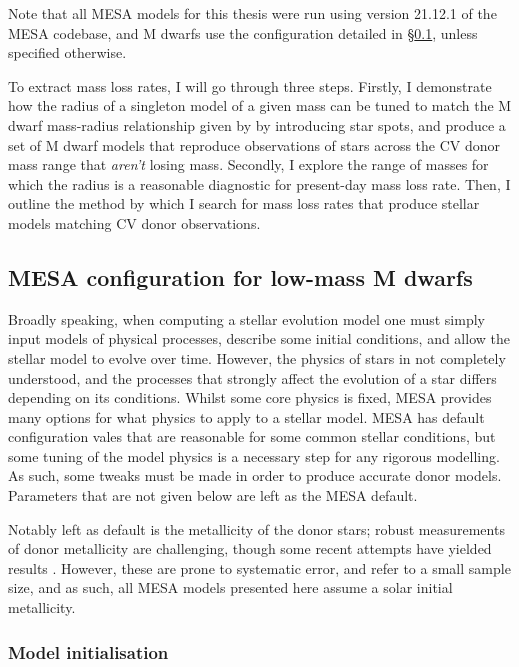 Note that all MESA models for this thesis were run using version 21.12.1 of the MESA codebase, and M dwarfs use the configuration detailed in \S\ref{sect:modelling:MESA configs}, unless specified otherwise.

To extract mass loss rates, I will go through three steps.
Firstly, I demonstrate how the radius of a singleton model of a given mass can be tuned to match the M dwarf mass-radius relationship given by \citet{BrownPrep} by introducing star spots, and produce a set of M dwarf models that reproduce observations of stars across the CV donor mass range that \textit{aren't} losing mass.
Secondly, I explore the range of masses for which the radius is a reasonable diagnostic for present-day mass loss rate.
Then, I outline the method by which I search for mass loss rates that produce stellar models matching CV donor observations.


\subsection{MESA configuration for low-mass M dwarfs}
\label{sect:modelling:MESA configs}

Broadly speaking, when computing a stellar evolution model one must simply input models of physical processes, describe some initial conditions, and allow the stellar model to evolve over time. However, the physics of stars in not completely understood, and the processes that strongly affect the evolution of a star differs depending on its conditions.
Whilst some core physics is fixed, MESA provides many options for what physics to apply to a stellar model. MESA has default configuration vales that are reasonable for some common stellar conditions, but some tuning of the model physics is a necessary step for any rigorous modelling.
As such, some tweaks must be made in order to produce accurate donor models.
Parameters that are not given below are left as the MESA default.

Notably left as default is the metallicity of the donor stars; robust measurements of donor metallicity are challenging, though some recent attempts have yielded results \citep{harrison2016,harrison2018}. However, these are prone to systematic error, and refer to a small sample size, and as such, all MESA models presented here assume a solar initial metallicity.


\subsubsection{Model initialisation}

